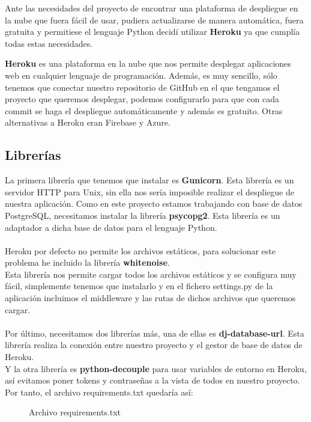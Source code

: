 Ante las necesidades del proyecto de encontrar una plataforma de despliegue en la nube que fuera fácil de usar, pudiera actualizarse de manera automática, fuera gratuita y permitiese el lenguaje Python decidí utilizar \textbf{Heroku} ya que cumplía todas estas necesidades. 

\textbf{Heroku} es una plataforma en la nube que nos permite desplegar aplicaciones web en cualquier lenguaje de programación.
Además, es muy sencillo, sólo tenemos que conectar nuestro repositorio de GitHub en el que tengamos el proyecto que queremos desplegar,
podemos configurarlo para que con cada commit se haga el despliegue automáticamente y además es gratuito. Otras alternativas a Heroku 
eran Firebase y Azure.

\subsection{Librerías}

La primera librería que tenemos que instalar es \textbf{Gunicorn}. Esta librería es un servidor HTTP para Unix, sin ella nos sería imposible realizar el despliegue de nuestra aplicación.
Como en este proyecto estamos trabajando con base de datos PostgreSQL, necesitamos instalar la librería \textbf{psycopg2}. Esta librería es un adaptador a dicha base de datos para el lenguaje Python.\\\\
Heroku por defecto no permite los archivos estáticos, para solucionar este problema he incluido la librería \textbf{whitenoise}.\\
Esta librería nos permite cargar todos los archivos estáticos y se configura muy fácil, simplemente tenemos que instalarlo y en
el fichero settings.py de la aplicación incluimos el middleware y las rutas de dichos archivos que queremos cargar.\\\\
Por último, necesitamos dos librerías más, una de ellas es \textbf{dj-database-url}. Esta librería realiza la conexión entre nuestro proyecto y el gestor de base de datos de Heroku.\\
Y la otra librería es \textbf{python-decouple} para usar variables de entorno en Heroku, así evitamos poner tokens y contraseñas a la vista de todos en nuestro proyecto. \\

Por tanto, el archivo requirements.txt quedaría así:
\begin{figure}[H]
  \centering
  \noindent{}
  \caption{Archivo requirements.txt}
\end{figure}


